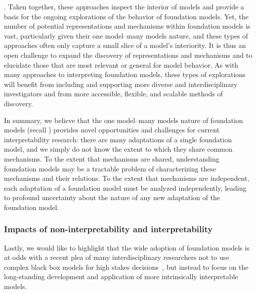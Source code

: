 \citep{olah2020zoom,mu2020compositional,carter2019activation,goh2021multimodal}. Taken together, these approaches inspect the interior of models and provide a basis for the ongoing explorations of the behavior of foundation models. Yet, the number of potential representations and mechanisms within foundation models is vast, particularly given their one model--many models nature, and these types of approaches often only capture a small slice of a model's interiority. It is thus an open challenge to expand the discovery of representations and mechanisms and to elucidate those that are most relevant or general for model behavior. As with many approaches to interpreting foundation models, these types of explorations will benefit from including and supporting more diverse and interdisciplinary investigators and from  more accessible, flexible, and scalable methods of discovery.

In summary, we believe that the one model--many models nature of foundation models (recall ) provides novel opportunities and challenges for current interpretability research: there are many adaptations of a single foundation model, and we simply do not know the extent to which they share common mechanisms. To the extent that mechanisms are shared, understanding foundation models may be a tractable problem of characterizing these mechanisms and their relations. To the extent that mechanisms are independent, each adaptation of a foundation model must be analyzed independently, leading to profound uncertainty about the nature of any new adaptation of the foundation model.

\subsubsection{Impacts of non-interpretability and interpretability}
\label{sec:interpretability-impacts}

Lastly, we would like to highlight that the wide adoption of foundation models is at odds with a recent plea of many interdisciplinary researchers not to use complex black box models for high stakes decisions~\citep[e.g. ][]{rudin2019stop}, but instead to focus on the long-standing development and application of more intrinsically interpretable models. 

